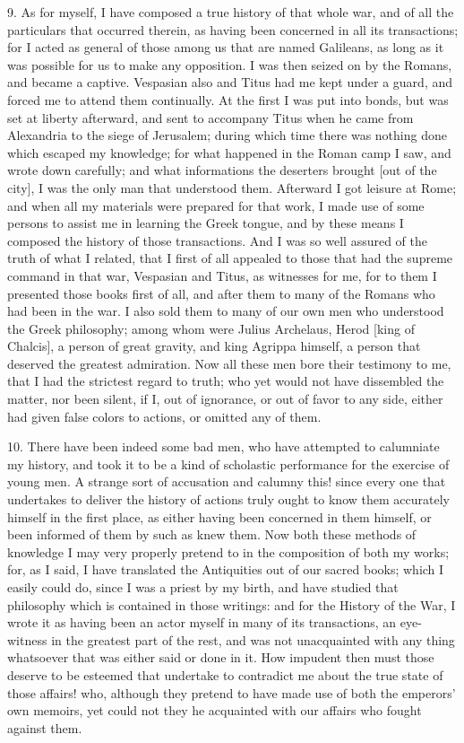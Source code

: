 9. As for myself, I have composed a true history of that whole war, and of
all the particulars that occurred therein, as having been concerned in all
its transactions; for I acted as general of those among us that are named
Galileans, as long as it was possible for us to make any opposition. I was
then seized on by the Romans, and became a captive. Vespasian also and
Titus had me kept under a guard, and forced me to attend them continually.
At the first I was put into bonds, but was set at liberty afterward, and
sent to accompany Titus when he came from Alexandria to the siege of
Jerusalem; during which time there was nothing done which escaped my
knowledge; for what happened in the Roman camp I saw, and wrote down
carefully; and what informations the deserters brought [out of the city],
I was the only man that understood them. Afterward I got leisure at Rome;
and when all my materials were prepared for that work, I made use of some
persons to assist me in learning the Greek tongue, and by these means I
composed the history of those transactions. And I was so well assured of
the truth of what I related, that I first of all appealed to those that
had the supreme command in that war, Vespasian and Titus, as witnesses for
me, for to them I presented those books first of all, and after them to
many of the Romans who had been in the war. I also sold them to many of
our own men who understood the Greek philosophy; among whom were Julius
Archelaus, Herod [king of Chalcis], a person of great gravity, and king
Agrippa himself, a person that deserved the greatest admiration. Now all
these men bore their testimony to me, that I had the strictest regard to
truth; who yet would not have dissembled the matter, nor been silent, if
I, out of ignorance, or out of favor to any side, either had given false
colors to actions, or omitted any of them.

10. There have been indeed some bad men, who have attempted to calumniate
my history, and took it to be a kind of scholastic performance for the
exercise of young men. A strange sort of accusation and calumny this!
since every one that undertakes to deliver the history of actions truly
ought to know them accurately himself in the first place, as either having
been concerned in them himself, or been informed of them by such as knew
them. Now both these methods of knowledge I may very properly pretend to
in the composition of both my works; for, as I said, I have translated the
Antiquities out of our sacred books; which I easily could do, since I was
a priest by my birth, and have studied that philosophy which is contained
in those writings: and for the History of the War, I wrote it as having
been an actor myself in many of its transactions, an eye-witness in the
greatest part of the rest, and was not unacquainted with any thing
whatsoever that was either said or done in it. How impudent then must
those deserve to be esteemed that undertake to contradict me about the
true state of those affairs! who, although they pretend to have made use
of both the emperors' own memoirs, yet could not they he acquainted with
our affairs who fought against them.

